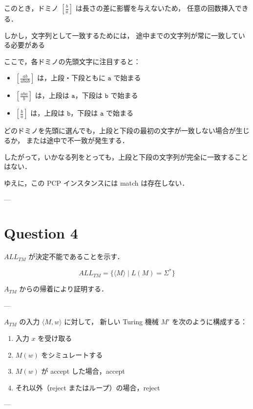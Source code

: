 \documentclass[uplatex,a4paper,11pt]{jsarticle}
\begin{document}
このとき，ドミノ $\left[\frac{b}{a}\right]$ は長さの差に影響を与えないため，
任意の回数挿入できる．

しかし，文字列として一致するためには，
途中までの文字列が常に一致している必要がある

ここで，各ドミノの先頭文字に注目すると：

\begin{itemize}
    \item $\left[\frac{ab}{abab}\right]$ は，上段・下段ともに $\mathtt{a}$ で始まる
    \item $\left[\frac{aba}{b}\right]$ は，上段は $\mathtt{a}$，下段は $\mathtt{b}$ で始まる
    \item $\left[\frac{b}{a}\right]$ は，上段は $\mathtt{b}$，下段は $\mathtt{a}$ で始まる
\end{itemize}

どのドミノを先頭に選んでも，上段と下段の最初の文字が一致しない場合が生じるか，
または途中で不一致が発生する．

したがって，いかなる列をとっても，上段と下段の文字列が完全に一致することはない．

ゆえに，この PCP インスタンスには match は存在しない．

---

\section*{Question 4}

$ALL_{TM}$ が決定不能であることを示す．

\[
ALL_{TM} = \{ \langle M \rangle \mid L(M) = \Sigma^* \}
\]

$A_{TM}$ からの帰着により証明する．

---

$A_{TM}$ の入力 $\langle M, w \rangle$ に対して，
新しい Turing 機械 $M'$ を次のように構成する：

\begin{enumerate}
    \item 入力 $x$ を受け取る
    \item $M(w)$ をシミュレートする
    \item $M(w)$ が accept した場合，accept
    \item それ以外（reject またはループ）の場合，reject
\end{enumerate}

---
\end{document}
